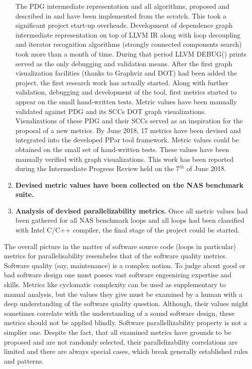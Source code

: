 \begin{enumerate}[align=left,leftmargin=*]
\null\qquad The PDG intermediate representation and all algorithms, proposed and described in \cite{pdg-paper} and \cite{iterator-recognition-paper} have been implemented from the scratch. This took a significant project start-up overheads. Development of dependence graph intermediate representation on top of LLVM IR along with loop decoupling and iterator recognition algorithms (strongly connected components search) took more than a month of time. During that period LLVM DEBUG() prints served as the only debugging and validation means.\newline
\null\qquad After the first graph visualization facilities (thanks to Graphviz and DOT) had been added the project, the first research work has actually started. Along with further validation, debugging and development of the tool, first metrics started to appear on the small hand-written tests. Metric values have been manually validated against PDG and its SCCs DOT graph visualizations. Visualizations of these PDG and their SCCs served as an inspiration for the proposal of a new metrics.\newline
\null\qquad By June 2018, 17 metrics have been devised and integrated into the developed PPar tool framework. Metric values could be obtained on the small set of hand-written tests. These values have been manually verified with graph visualizations. This work has been reported during the Intermediate Progress Review held on the 7$^{th}$ of June 2018.                    
\item \textbf{Devised metric values have been collected on the NAS benchmark suite.}
	
\item \textbf{Analysis of devised parallelizability metrics.} Once all metric values had been gathered for all NAS benchmark loops and all loops had been classified with Intel C/C++ compiler, the final stage of the project could be started.     
	
\end{enumerate}





\qquad The overall picture in the matter of software source code (loops in particular) metrics for  parallelisability resembeles that of the software quality metrics. Software quality (say, maintenance) is a complex notion. To judge about good or bad software design one must posses vast software engeeniring expertise and skills. Metrics like cyclomatic complexity can be used as supplementary to manual analysis, but the values they give must be examined by a human with a deep understanding of the software quality question. Although, their values might sometimes correlate with the understanding of a sound software design, these metrics should not be applied blindly.\newline
\null\qquad Software parallellizability property is not a simplier one. Despite the fact, that all examined metrics have grounds to be proposed and are not randomly selected, their parallelizability correlations are limited and there are always special cases, which break generally established rules and patterns.\newline


